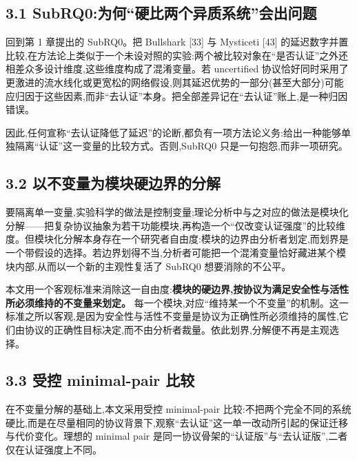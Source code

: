 \documentclass[UTF8,fontset=windows,a4paper,11pt]{ctexart}
\begin{document}
\subsection{3.1
SubRQ0:为何``硬比两个异质系统''会出问题}\label{subrq0ux4e3aux4f55ux786cux6bd4ux4e24ux4e2aux5f02ux8d28ux7cfbux7edfux4f1aux51faux95eeux9898}

回到第 1 章提出的 SubRQ0。把 Bullshark {[}33{]} 与 Mysticeti {[}43{]}
的延迟数字并置比较,在方法论上类似于一个未设对照的实验:两个被比较对象在``是否认证''之外还相差众多设计维度,这些维度构成了混淆变量。若
uncertified
协议恰好同时采用了更激进的流水线化或更宽松的网络假设,则其延迟优势的一部分(甚至大部分)可能应归因于这些因素,而非``去认证''本身。把全部差异记在``去认证''账上,是一种归因错误。

因此,任何宣称``去认证降低了延迟''的论断,都负有一项方法论义务:给出一种能够单独隔离``认证''这一变量的比较方式。否则,SubRQ0
只是一句抱怨,而非一项研究。

\subsection{3.2
以不变量为模块硬边界的分解}\label{ux4ee5ux4e0dux53d8ux91cfux4e3aux6a21ux5757ux786cux8fb9ux754cux7684ux5206ux89e3}

要隔离单一变量,实验科学的做法是控制变量;理论分析中与之对应的做法是模块化分解------把复杂协议抽象为若干功能模块,再构造一个``仅改变认证强度''的比较维度。但模块化分解本身存在一个研究者自由度:模块的边界由分析者划定,而划界是一个带假设的选择。若边界划得不当,分析者可能把一个混淆变量恰好藏进某个模块内部,从而以一个新的主观性复活了
SubRQ0 想要消除的不公平。

本文用一个客观标准来消除这一自由度:\textbf{模块的硬边界,按协议为满足安全性与活性所必须维持的不变量来划定。}
每一个模块,对应``维持某一个不变量''的机制。这一标准之所以客观,是因为安全性与活性不变量是协议为正确性所必须维持的属性,它们由协议的正确性目标决定,而不由分析者裁量。依此划界,分解便不再是主观选择。

\subsection{3.3 受控 minimal-pair
比较}\label{ux53d7ux63a7-minimal-pair-ux6bd4ux8f83}

在不变量分解的基础上,本文采用受控 minimal-pair
比较:不把两个完全不同的系统硬比,而是在尽量相同的协议背景下,观察``去认证''这一单一改动所引起的保证迁移与代价变化。理想的
minimal pair
是同一协议骨架的``认证版''与``去认证版'',二者仅在认证强度上不同。
\end{document}
